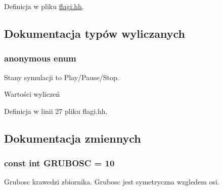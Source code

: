 Definicja w pliku \hyperlink{flagi_8hh_source}{flagi.\-hh}.



\subsection{Dokumentacja typów wyliczanych}
\hypertarget{flagi_8hh_a06fc87d81c62e9abb8790b6e5713c55b}{\subsubsection[{anonymous enum}]{\setlength{\rightskip}{0pt plus 5cm}anonymous enum}}\label{flagi_8hh_a06fc87d81c62e9abb8790b6e5713c55b}
Stany symulacji to Play/\-Pause/\-Stop. \begin{Desc}
\item[Wartości wyliczeń]\par
\begin{description}
\item[{\em 
\hypertarget{flagi_8hh_a06fc87d81c62e9abb8790b6e5713c55ba4957581ee0386c284fd318121e335af6}{e\-S\-T\-O\-P}\label{flagi_8hh_a06fc87d81c62e9abb8790b6e5713c55ba4957581ee0386c284fd318121e335af6}
}]\item[{\em 
\hypertarget{flagi_8hh_a06fc87d81c62e9abb8790b6e5713c55ba6a2f69efc37338427ecd0db296923a79}{e\-P\-A\-U\-S\-E}\label{flagi_8hh_a06fc87d81c62e9abb8790b6e5713c55ba6a2f69efc37338427ecd0db296923a79}
}]\item[{\em 
\hypertarget{flagi_8hh_a06fc87d81c62e9abb8790b6e5713c55baecdbae639704e0b7e4b5478734e45b8d}{e\-P\-L\-A\-Y}\label{flagi_8hh_a06fc87d81c62e9abb8790b6e5713c55baecdbae639704e0b7e4b5478734e45b8d}
}]\end{description}
\end{Desc}


Definicja w linii 27 pliku flagi.\-hh.



\subsection{Dokumentacja zmiennych}
\hypertarget{flagi_8hh_a359a95636f17b8e9b7a01389d75b521d}{
\subsubsection[{G\-R\-U\-B\-O\-S\-C}]{\setlength{\rightskip}{0pt plus 5cm}const int G\-R\-U\-B\-O\-S\-C = 10}}\label{flagi_8hh_a359a95636f17b8e9b7a01389d75b521d}
Grubosc krawedzi zbiornika. Grubosc jest symetryczna wzgledem osi. 

